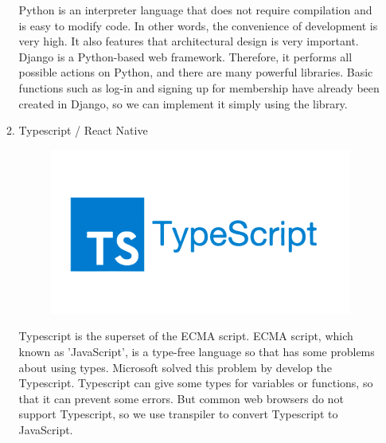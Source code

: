 \documentclass[conference]{IEEEtran}
\begin{document}
\begin{enumerate}
\begin{enumerate}
\begin{figure}[H]
                 \end{figure}
        Python is an interpreter language that does not require compilation and is easy to modify code. In other words, the convenience of development is very high. It also features that architectural design is very important. \hfill \break
        Django is a Python-based web framework. Therefore, it performs all possible actions on Python, and there are many powerful libraries. Basic functions such as log-in and signing up for membership have already been created in Django, so we can implement it simply using the library.
        \item Typescript / React Native\\
        \begin{figure}[H]
                 \centering
                 \includegraphics[scale=0.2]{new_assets/typescript-logo.png}
                 \end{figure}
        Typescript is the superset of the ECMA script. ECMA script, which known as 'JavaScript', is a type-free language so that has some problems about using types. Microsoft solved this problem by develop the Typescript. Typescript can give some types for variables or functions, so that it can prevent some errors. But common web browsers do not support Typescript, so we use transpiler to convert Typescript to JavaScript. \hfill \break
        \begin{figure}[H]
                 \centering

\end{figure}
\end{enumerate}
\end{enumerate}
\end{document}
